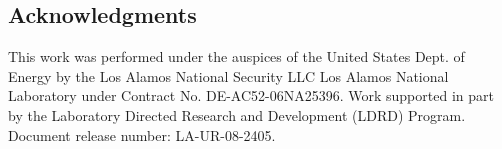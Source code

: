 \documentclass[journal,twoside]{IEEEtran}
\begin{document}
\subsection*{Acknowledgments}

This work was performed under the auspices of the United States Dept.
of Energy by the Los Alamos National Security LLC Los Alamos National
Laboratory under Contract No. DE-AC52-06NA25396.  Work supported in
part by the Laboratory Directed Research and Development (LDRD)
Program.  Document release number: LA-UR-08-2405.












\end{document}
